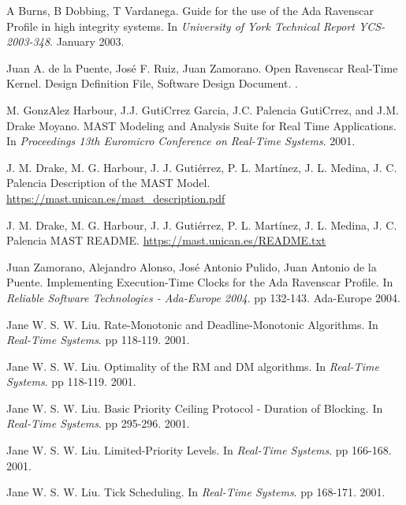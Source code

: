 \documentclass{article}
\begin{document}
\begin{thebibliography}{1}

A Burns, B Dobbing, T Vardanega.
\newblock Guide for the use of the Ada Ravenscar Profile in high integrity systems.
\newblock In {\em University of York Technical Report YCS-2003-348}. January 2003.

Juan A. de la Puente, José F. Ruiz, Juan Zamorano.
\newblock Open Ravenscar Real-Time Kernel. Design Definition File, Software Design Document.
.

M. GonzAlez Harbour, J.J. GutiCrrez Garcia, J.C. Palencia GutiCrrez, and J.M. Drake Moyano.
\newblock MAST Modeling and Analysis Suite for Real Time Applications.
\newblock In {\em Proceedings 13th Euromicro Conference on Real-Time Systems}. 2001.

J. M. Drake, M. G. Harbour, J. J. Gutiérrez, P. L. Martínez, J. L. Medina, J. C. Palencia
\newblock Description of the MAST Model.
\newblock \url{https://mast.unican.es/mast_description.pdf}

J. M. Drake, M. G. Harbour, J. J. Gutiérrez, P. L. Martínez, J. L. Medina, J. C. Palencia
\newblock MAST README.
\newblock \url{https://mast.unican.es/README.txt}

Juan Zamorano, Alejandro Alonso, José Antonio Pulido, Juan Antonio de la Puente.
\newblock Implementing Execution-Time Clocks for the Ada Ravenscar Profile.
\newblock In {\em Reliable Software Technologies - Ada-Europe 2004}. pp 132-143. Ada-Europe 2004.

Jane W. S. W. Liu.
\newblock Rate-Monotonic and Deadline-Monotonic Algorithms.
\newblock In {\em Real-Time Systems}. pp 118-119. 2001.

Jane W. S. W. Liu.
\newblock Optimality of the RM and DM algorithms.
\newblock In {\em Real-Time Systems}. pp 118-119. 2001.

Jane W. S. W. Liu.
\newblock Basic Priority Ceiling Protocol - Duration of Blocking.
\newblock In {\em Real-Time Systems}. pp 295-296. 2001.

Jane W. S. W. Liu.
\newblock Limited-Priority Levels.
\newblock In {\em Real-Time Systems}. pp 166-168. 2001.

Jane W. S. W. Liu.
\newblock Tick Scheduling.
\newblock In {\em Real-Time Systems}. pp 168-171. 2001.


\end{thebibliography}
\end{document}
